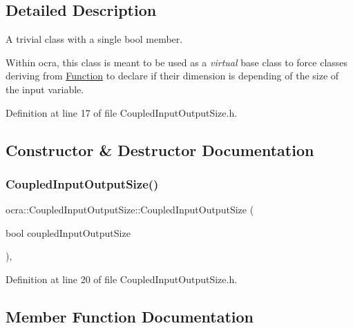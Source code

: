 \subsection{Detailed Description}
A trivial class with a single bool member.

Within ocra, this class is meant to be used as a {\itshape virtual} base class to force classes deriving from \hyperlink{classocra_1_1Function}{Function} to declare if their dimension is depending of the size of the input variable. 

Definition at line 17 of file Coupled\+Input\+Output\+Size.\+h.



\subsection{Constructor \& Destructor Documentation}
\hypertarget{classocra_1_1CoupledInputOutputSize_a464c947e199233598a248ff6409ab93d}{}\label{classocra_1_1CoupledInputOutputSize_a464c947e199233598a248ff6409ab93d} 
\subsubsection{\texorpdfstring{Coupled\+Input\+Output\+Size()}{CoupledInputOutputSize()}}
{\footnotesize\ttfamily ocra\+::\+Coupled\+Input\+Output\+Size\+::\+Coupled\+Input\+Output\+Size (\begin{DoxyParamCaption}\item[{bool}]{coupled\+Input\+Output\+Size }\end{DoxyParamCaption})\hspace{0.3cm}{\ttfamily [inline]}, {\ttfamily [protected]}}



Definition at line 20 of file Coupled\+Input\+Output\+Size.\+h.



\subsection{Member Function Documentation}
\hypertarget{classocra_1_1CoupledInputOutputSize_a10e82ae3bbe410a29f7ed5a54ac105b0}{}\label{classocra_1_1CoupledInputOutputSize_a10e82ae3bbe410a29f7ed5a54ac105b0} 
